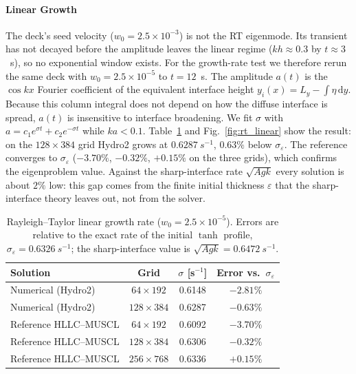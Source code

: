 \paragraph{Linear Growth}
The deck's seed velocity ($w_0 = 2.5\times10^{-3}$) is not the RT eigenmode. Its transient has not decayed before the amplitude leaves the linear regime ($kh \approx 0.3$ by $t \approx 3$~s), so no exponential window exists. For the growth-rate test we therefore rerun the same deck with $w_0 = 2.5\times10^{-5}$ to $t = 12$~s. The amplitude $a(t)$ is the $\cos kx$ Fourier coefficient of the equivalent interface height $y_i(x) = L_y - \int \eta\,\mathrm{d}y$. Because this column integral does not depend on how the diffuse interface is spread, $a(t)$ is insensitive to interface broadening. We fit $\sigma$ with $a = c_1 e^{\sigma t} + c_2 e^{-\sigma t}$ while $ka < 0.1$. Table~\ref{tab:rt_growth} and Fig.~\ref{fig:rt_linear} show the result: on the $128\times384$ grid Hydro2 grows at $0.6287~\si{s^{-1}}$, $0.63\%$ below $\sigma_\varepsilon$. The reference converges to $\sigma_\varepsilon$ ($-3.70\%$, $-0.32\%$, $+0.15\%$ on the three grids), which confirms the eigenproblem value. Against the sharp-interface rate $\sqrt{Agk}$ every solution is about $2\%$ low: this gap comes from the finite initial thickness $\varepsilon$ that the sharp-interface theory leaves out, not from the solver.

\begin{table}[H]
    \centering
    \caption{Rayleigh--Taylor linear growth rate ($w_0 = 2.5\times10^{-5}$). Errors are relative to the exact rate of the initial $\tanh$ profile, $\sigma_\varepsilon = 0.6326~\si{s^{-1}}$; the sharp-interface value is $\sqrt{Agk} = 0.6472~\si{s^{-1}}$.}
    \label{tab:rt_growth}
    \begin{tabular}{l c c c}
        \hline
        Solution & Grid & $\sigma$ [s$^{-1}$] & Error vs.\ $\sigma_\varepsilon$ \\
        \hline
        Numerical (Hydro2)        & $64\times192$  & 0.6148 & $-2.81\%$ \\
        Numerical (Hydro2)        & $128\times384$ & 0.6287 & $-0.63\%$ \\
        Reference HLLC--MUSCL     & $64\times192$  & 0.6092 & $-3.70\%$ \\
        Reference HLLC--MUSCL     & $128\times384$ & 0.6306 & $-0.32\%$ \\
        Reference HLLC--MUSCL     & $256\times768$ & 0.6336 & $+0.15\%$ \\
        \hline
    \end{tabular}
\end{table}

